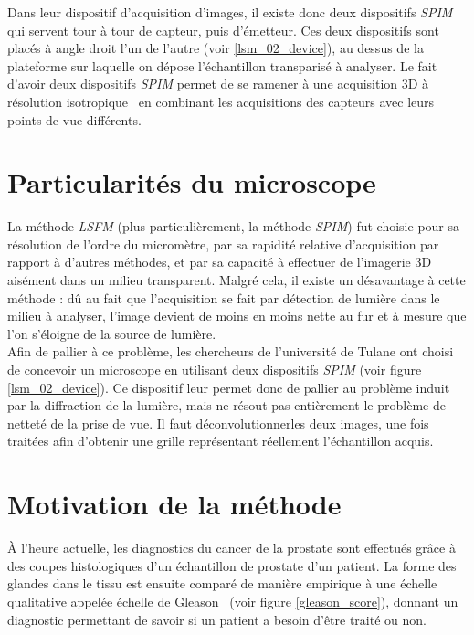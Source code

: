 \documentclass[utf8]{stageM2R}
\begin{document}
{{			Dans leur dispositif d'acquisition d'images, il existe donc deux dispositifs \textit{SPIM} qui servent tour à tour de capteur, puis d'émetteur. Ces deux dispositifs sont placés à angle droit l'un de l'autre (voir \ref{lsm_02_device}), au dessus de la plateforme sur laquelle on dépose l'échantillon transparisé à analyser. Le fait d'avoir deux dispositifs \textit{SPIM} permet de se ramener à une acquisition 3D à résolution isotropique\footnotemark~ en combinant les acquisitions des capteurs avec leurs points de vue différents.\\
		}
		\section{Particularités du microscope}\label{section:02_02_microscope}
		{
			La méthode \textit{LSFM} (plus particulièrement, la méthode \textit{SPIM}) fut choisie pour sa résolution de l'ordre du micromètre, par sa rapidité relative d'acquisition par rapport à d'autres méthodes, et par sa capacité à effectuer de l'imagerie 3D aisément dans un milieu transparent. Malgré cela, il existe un désavantage à cette méthode : dû au fait que l'acquisition se fait par détection de lumière dans le milieu à analyser, l'image devient de moins en moins nette au fur et à mesure que l'on s'éloigne de la source de lumière.\\
			Afin de pallier à ce problème, les chercheurs de l'université de Tulane ont choisi de concevoir un microscope en utilisant deux dispositifs \textit{SPIM} (voir figure \ref{lsm_02_device}). Ce dispositif leur permet donc de pallier au problème induit par la diffraction de la lumière, mais ne résout pas entièrement le problème de netteté de la prise de vue. Il faut déconvolutionner\footnotemark les deux images, une fois traitées afin d'obtenir une grille représentant réellement l'échantillon acquis.
		}
		\section{Motivation de la méthode}\label{section:02_03_motivation}
		{
			À l'heure actuelle, les diagnostics du cancer de la prostate sont effectués grâce à des coupes histologiques d'un échantillon de prostate d'un patient. La forme des glandes dans le tissu est ensuite comparé de manière empirique à une échelle qualitative appelée échelle de Gleason~\cite{citation_gleason_score} (voir figure \ref{gleason_score}), donnant un diagnostic permettant de savoir si un patient a besoin d'être traité ou non.\\

}}
\end{document}
